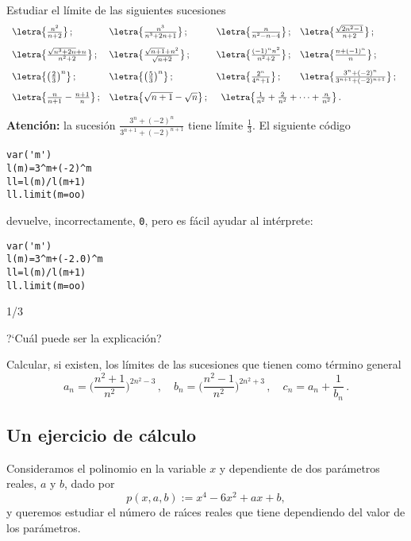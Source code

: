 \begin{ejer}\setcounter{temp}{0}
Estudiar el límite de las siguientes sucesiones
\small
\newcommand{\linea}[2]{\letra \big\{\frac{#1}{#2}\big\}\,;}
$$
\begin{array}{*4{l@{\quad}}}
 \linea{n^2}{n+2}
 &
 \linea{n^3}{n^3+2n+1}
 &
 \linea{n}{n^2-n-4}
 &
 \linea{\sqrt{2n^2-1}}{n+2}
 \\[10pt]
 \linea{\sqrt{n^3+2n}+n}{n^2+2}
 &
 \linea{\sqrt{n+1}+n^2}{\sqrt{n+2}}
 &
 \linea{(-1)^nn^2}{n^2+2}
 &
 \linea{n+(-1)^n}{n}
 \\[10pt]
 \letra \big\{\big(\frac23\big)^n\big\}\,;
 &
 \letra \big\{\big(\frac53\big)^n\big\}\,;
 &
 \linea{2^n}{4^n+1}
 &
 \linea{3^n+(-2)^n}{3^{n+1}+(-2)^{n+1}}
 \\[10pt]
 \letra\big\{\frac{n}{n+1}-\frac{n+1}{n}\big\}\,;
 &
 \letra \big\{\sqrt{n+1}-\sqrt{n}\big\}\,;
 &
 \multicolumn{2}{l}{\letra
\big\{\frac{1}{n^2}+\frac{2}{n^2}+\dots+\frac{n}{n^2}\big\}\,.}
\end{array}
$$
\normalsize
\end{ejer}
\noindent\textbf{Atención: } la sucesión $\frac{3^n+(-2)^n}{3^{n+1}+(-2)^{n+1}}$
tiene
límite $\frac13$. El siguiente código
\begin{lstlisting}[numbers=none]
var('m')
l(m)=3^m+(-2)^m
ll=l(m)/l(m+1)
ll.limit(m=oo)
\end{lstlisting}
devuelve, incorrectamente, \lstinline[basicstyle=\color{NavyBlue}]|0|, %
pero es f\'acil ayudar al int\'erprete:
\begin{lstlisting}[numbers=none]
var('m')
l(m)=3^m+(-2.0)^m
ll=l(m)/l(m+1)
ll.limit(m=oo)
\end{lstlisting}
\begin{Output}
	1/3
\end{Output}

?`Cu\'al puede ser la explicaci\'on?

\begin{ejer}
Calcular, si existen, los límites de las sucesiones que tienen como término
general
$$
a_n=\Big(\frac{n^2+1}{n^2}\Big)^{2n^2-3}\,,\quad
b_n=\Big(\frac{n^2-1}{n^2}\Big)^{2n^2+3}\,,\quad
c_n=a_n+\frac1{b_n}\,.
$$
\end{ejer}

\subsection{Un ejercicio de c\'alculo}

Consideramos el polinomio en la variable $x$ y dependiente de dos par\'ametros
reales, $a$ y $b$, dado por 
\[p(x,a,b):=x^4-6x^2+ax+b,\]
\noindent y queremos estudiar el n\'umero de ra\'{\i}ces reales que tiene
dependiendo del valor de los par\'ametros.

